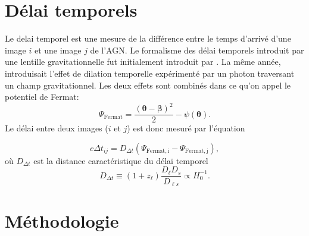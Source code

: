 \documentclass[times,10pt,twocolumn]{article}
\begin{document}
\section{Délai temporels}
Le delai temporel est une mesure de la différence entre le temps d'arrivé d'une image $i$ 
et une image $j$ de l'AGN. Le formalisme des délai temporels introduit par une 
lentille gravitationnelle fut initialement introduit par \cite{Refsdal1964}. La même 
année, \cite{Shapiro1964} introduisait l'effet de dilation temporelle expérimenté par 
un photon traversant un champ gravitationnel. Les deux effets sont combinés dans ce 
qu'on appel le potentiel de Fermat:
\begin{equation}\label{eq:PotentielFermat} 
        \Psi_{\mathrm{Fermat}} = \frac{(\boldsymbol{\theta} - \boldsymbol{\beta})^{2}}{2}
        - \psi(\boldsymbol{\theta}).
\end{equation} 
Le délai entre deux images ($i$ et $j$) est donc mesuré par l'équation




\begin{equation}\label{eq:TimeDelay} 
        c \Delta t_{ij} = D_{\Delta t} \left( \Psi_{\mathrm{Fermat, i}} - 
        \Psi_{\mathrm{Fermat, j}} \right),
\end{equation} 
où $D_{\Delta t}$ est la distance caractéristique du délai temporel
\begin{equation}\label{eq:Ddt} 
        D_{\Delta t} \equiv (1 + z_{\ell}) \frac{D_\ell D_s}{D_{\ell s}} \propto H_0^{-1}.
\end{equation} 
\section{Méthodologie}\label{sec:metho}
\subsection{}
\end{document}
